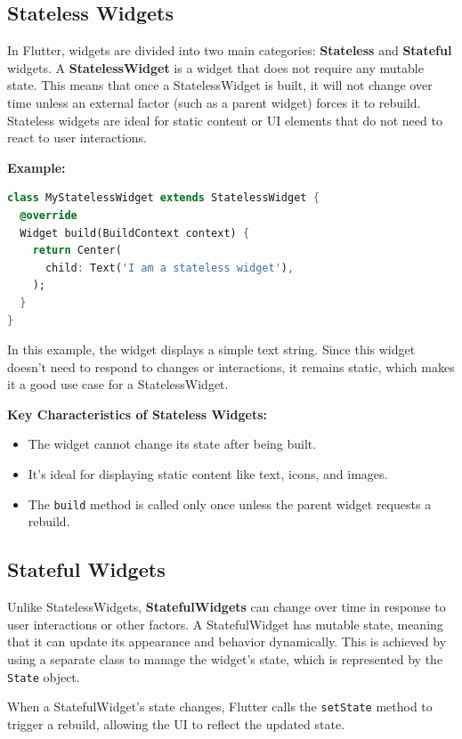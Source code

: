 \documentclass[12pt,a4paper]{report}
\begin{document}
\subsection{Stateless Widgets}
In Flutter, widgets are divided into two main categories: \textbf{Stateless} and \textbf{Stateful} widgets. A \textbf{StatelessWidget} is a widget that does not require any mutable state. This means that once a StatelessWidget is built, it will not change over time unless an external factor (such as a parent widget) forces it to rebuild. Stateless widgets are ideal for static content or UI elements that do not need to react to user interactions.

\textbf{Example:}

\begin{lstlisting}[language=Dart, caption={Example of a Stateless Widget}]
class MyStatelessWidget extends StatelessWidget {
  @override
  Widget build(BuildContext context) {
    return Center(
      child: Text('I am a stateless widget'),
    );
  }
}
\end{lstlisting}

In this example, the widget displays a simple text string. Since this widget doesn’t need to respond to changes or interactions, it remains static, which makes it a good use case for a StatelessWidget.

\textbf{Key Characteristics of Stateless Widgets:}
\begin{itemize}
    \item The widget cannot change its state after being built.
    \item It’s ideal for displaying static content like text, icons, and images.
    \item The \texttt{build} method is called only once unless the parent widget requests a rebuild.
\end{itemize}

\subsection{Stateful Widgets}
Unlike StatelessWidgets, \textbf{StatefulWidgets} can change over time in response to user interactions or other factors. A StatefulWidget has mutable state, meaning that it can update its appearance and behavior dynamically. This is achieved by using a separate class to manage the widget's state, which is represented by the \texttt{State} object. 

When a StatefulWidget's state changes, Flutter calls the \texttt{setState} method to trigger a rebuild, allowing the UI to reflect the updated state.
\end{document}
